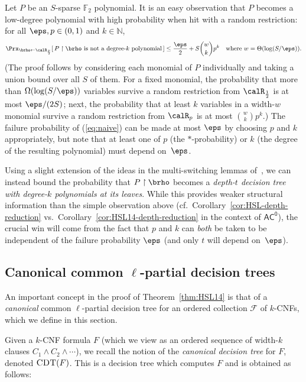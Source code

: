 \documentclass{toc}
\theoremstyle{plain}
\newcommand{\acz}{\mathsf{AC^0}}
\newcommand{\uhr}{\upharpoonright}
\newcommand{\CDT}{\textsc{CDT}}
\renewcommand{\N}{\mathds{N}}
\renewcommand{\F}{\mathds{F}}
\begin{document}
Let $P$ be an $S$-sparse $\F_2$ polynomial. It is an easy observation that $P$ becomes a low-degree polynomial with high probability when hit with a random restriction: for all $\eps, p\in (0,1)$ and $k\in \N$, 
\begin{equation} \Prx_{\brho\leftarrow\calR_{\frac{p}{2}}}[\, P\uhr \brho \text{~is not a degree-$k$ polynomial}\,] \le \frac{\eps}{2} + S{w\choose k}p^k \quad \text{where $w = \Theta(\log(S/\eps))$.} \label{eq:naive}
\end{equation} 
(The proof follows by considering each monomial of $P$ individually and taking a union bound over all $S$ of them. For a fixed monomial, the probability that more than $\Omega(\log(S/\eps))$ variables survive a random restriction from $\calR_{\frac{1}{2}}$ is at most $\eps/(2S)$; next, the probability that at least $k$ variables in a width-$w$ monomial survive a random restriction from $\calR_p$ is at most ${w \choose k}p^k$.)   The failure probability of (\ref{eq:naive}) can be made at most $\eps$ by choosing $p$ and $k$ appropriately, but note that at least one of $p$ (the $\ast$-probability) or $k$ (the degree of the resulting polynomial) must depend on~$\eps$. 

Using a slight extension of the ideas in the multi-switching lemmas of~\cite{Has14}, we can instead bound the probability that $P \uhr \brho$ becomes a \emph{depth-$t$ decision tree with degree-$k$ polynomials at its leaves}.  While this provides weaker structural information than the simple observation above (cf.~Corollary~\ref{cor:HSL-depth-reduction} vs.~Corollary~\ref{cor:HSL14-depth-reduction} in the context of $\acz$), the crucial win will come from the fact that $p$ and $k$ can \emph{both} be taken to be independent of the failure probability $\eps$ (and only $t$ will depend on~$\eps$). 


\subsection{Canonical common $\ell$-partial decision trees} \label{sec:ccdt}

An important concept in the proof of Theorem~\ref{thm:HSL14} is that of a \emph{canonical} common $\ell$-partial decision tree for an ordered collection $\mathscr{F}$ of $k$-CNFs, which we define in this section.

Given a $k$-CNF formula $F$ (which we view as an ordered sequence of width-$k$ clauses $C_1 \wedge C_2 \wedge \cdots$), we recall the notion of the \emph{canonical decision tree} for $F$, denoted $\CDT(F)$.  This is a decision tree which computes $F$ and is obtained as follows:  
\end{document}
